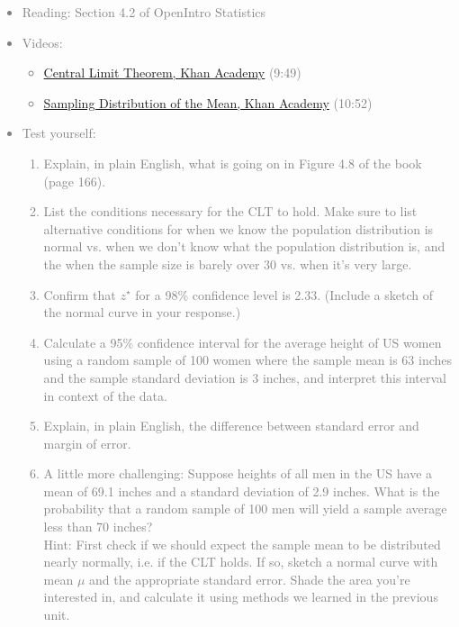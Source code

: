 \documentclass[11pt]{article}
\newcommand{\gray}[1]{\textcolor{gray}{#1}}
\begin{document}
\gray{
{\it
\vspace{-0.5cm}
\begin{itemize}
\renewcommand{\labelitemi}{{\textcolor{dark}{$\ast$}}}
\item Reading: Section 4.2 of OpenIntro Statistics
\item Videos: 
\begin{itemize}
\item \href{http://www.khanacademy.org/math/statistics/v/central-limit-theorem}{Central Limit Theorem, Khan Academy} (9:49)
\item \href{http://www.khanacademy.org/math/statistics/v/sampling-distribution-of-the-sample-mean}{Sampling Distribution of the Mean, Khan Academy} (10:52)
\end{itemize}
\item Test yourself: 
{\small
\begin{enumerate}
\item Explain, in plain English, what is going on in Figure 4.8 of the book (page 166).
\item List the conditions necessary for the CLT to hold. Make sure to list alternative conditions for when we know the population distribution is normal vs. when we don't know what the population distribution is, and the when the sample size is barely over 30 vs. when it's very large.
\item Confirm that $z^{\star}$ for a 98\% confidence level is 2.33. (Include a sketch of the normal curve in your response.)
\item Calculate a 95\% confidence interval for the average height of US women using a random sample of 100 women where the sample mean is 63 inches and the sample standard deviation is 3 inches, and interpret this interval in context of the data.
\item Explain, in plain English, the difference between standard error and margin of error.
\item A little more challenging: Suppose heights of all men in the US have a mean of 69.1 inches and a standard deviation of 2.9 inches. What is the probability that a random sample of 100 men will yield a sample average less than 70 inches?\\ 
Hint: First check if we should expect the sample mean to be distributed nearly normally, i.e. if the CLT holds. If so, sketch a normal curve with mean $\mu$ and the appropriate standard error. Shade the area you're interested in, and calculate it using methods we learned in the previous unit. 
\end{enumerate}
}
\end{itemize}
}}
\end{document}
